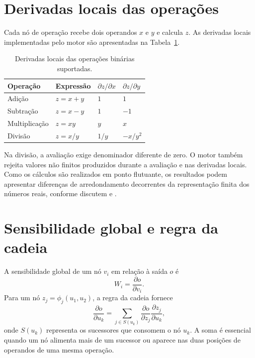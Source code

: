 \documentclass[12pt,openright,oneside,a4paper,brazil]{abntex2}
\begin{document}
\section{Derivadas locais das operações}
Cada nó de operação recebe dois operandos $x$ e $y$ e calcula $z$. As derivadas locais implementadas pelo motor são apresentadas na Tabela~\ref{tab:derivadas}.
\begin{table}[H]
\centering
\caption{Derivadas locais das operações binárias suportadas.}
\label{tab:derivadas}
\begin{tabular}{llll}
\toprule
Operação & Expressão & $\partial z/\partial x$ & $\partial z/\partial y$\\
\midrule
Adição & $z=x+y$ & $1$ & $1$\\
Subtração & $z=x-y$ & $1$ & $-1$\\
Multiplicação & $z=xy$ & $y$ & $x$\\
Divisão & $z=x/y$ & $1/y$ & $-x/y^2$\\
\bottomrule
\end{tabular}
\end{table}
Na divisão, a avaliação exige denominador diferente de zero. O motor também rejeita valores não finitos produzidos durante a avaliação e nas derivadas locais. Como os cálculos são realizados em ponto flutuante, os resultados podem apresentar diferenças de arredondamento decorrentes da representação finita dos números reais, conforme discutem  e .

\section{Sensibilidade global e regra da cadeia}
A sensibilidade global de um nó $v_i$ em relação à saída $o$ é
\begin{equation}
W_i=\frac{\partial o}{\partial v_i}.
\label{eq:sensibilidade}
\end{equation}
Para um nó $z_j=\phi_j(u_1,u_2)$, a regra da cadeia fornece
\begin{equation}
\frac{\partial o}{\partial u_k}=\sum_{j\in S(u_k)}\frac{\partial o}{\partial z_j}\frac{\partial z_j}{\partial u_k},
\label{eq:regra-cadeia}
\end{equation}
onde $S(u_k)$ representa os sucessores que consomem o nó $u_k$. A soma é essencial quando um nó alimenta mais de um sucessor ou aparece nas duas posições de operandos de uma mesma operação.
\end{document}
